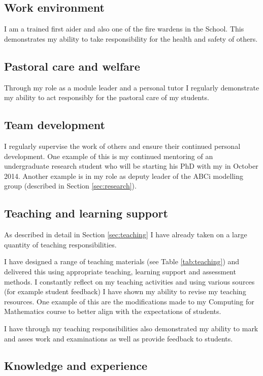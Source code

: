 \documentclass{article}
\begin{document}
\subsection{Work environment}

I am a trained first aider and also one of the fire wardens in the School.
This demonstrates my ability to take responsibility for the health and safety of others.

\subsection{Pastoral care and welfare}

Through my role as a module leader and a personal tutor I regularly demonstrate my ability to act responsibly for the pastoral care of my students.

\subsection{Team development}

I regularly supervise the work of others and ensure their continued personal development.
One example of this is my continued mentoring of an undergraduate research student who will be starting his PhD with my in October 2014.
Another example is in my role as deputy leader of the ABCi modelling group (described in Section \ref{sec:research}).

\subsection{Teaching and learning support}

As described in detail in Section \ref{sec:teaching} I have already taken on a large quantity of teaching responsibilities.

I have designed a range of teaching materials (see Table \ref{tab:teaching}) and delivered this using appropriate teaching, learning support and assessment methods.
I constantly reflect on my teaching activities and using various sources (for example student feedback) I have shown my ability to revise my teaching resources.
One example of this are the modifications made to my Computing for Mathematics course to better align with the expectations of students.

I have through my teaching responsibilities also demonstrated my ability to mark and asses work and examinations as well as provide feedback to students.

\subsection{Knowledge and experience}
\end{document}
